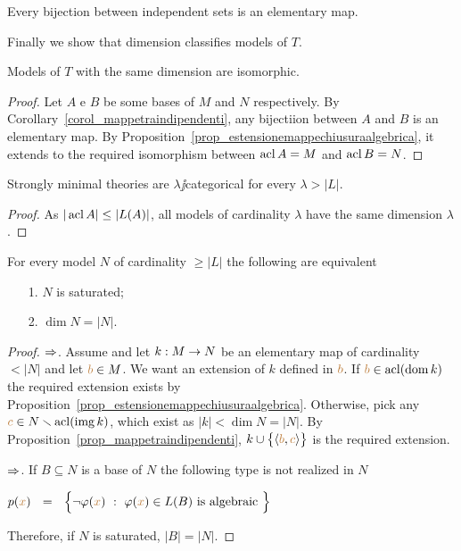 \begin{corollary}\label{corol_mappetraindipendenti} 
Every bijection between independent sets is an elementary map.\QED
\end{corollary}

Finally we show that dimension classifies models of $T$.

\begin{theorem}
Models of $T$ with the same dimension are isomorphic.
\end{theorem}
\begin{proof}
Let $A$ e $B$ be some bases of $M$ and $N$ respectively. By Corollary~\ref{corol_mappetraindipendenti}, any bijectiion between $A$ and $B$ is an elementary map. By Proposition~\ref{prop_estensionemappechiusuraalgebrica}, it extends to the required isomorphism between $\mathop{\rm acl} A=M$ and $\mathop{\rm acl} B=N$.
\end{proof}

\begin{corollary} 
Strongly minimal theories are $\lambda\jj$categorical for every $\lambda>|L|$.
\end{corollary}
\begin{proof}
As $|\mathop{\rm acl} A|\le |L(A)|$, all models of cardinality $\lambda$ have the same dimension $\lambda$.
\end{proof}

\begin{proposition} 
For every model $N$ of cardinality $\ge|L|$ the following are equivalent
\begin{itemize}
\item[1.] $N$ is saturated;
\item[2.] $\dim N=|N|$.
\end{itemize}
\end{proposition}

\begin{proof}
$\Rightarrow$. Assume  and let $k:M\rightarrow N$ be an elementary map of cardinality $<|N|$ and let ${\color{brown} b}\in M$. We want an extension of $k$ defined in ${\color{brown} b}$. If ${\color{brown} b}\in\mathop{\rm acl}(\mathop{\rm dom} k)$ the required extension exists by Proposition~\ref{prop_estensionemappechiusuraalgebrica}. Otherwise, pick any ${\color{brown} c}\in N\smallsetminus\mathop{\rm acl}(\mathop{\rm img} k)$, which exist as $|k|<\dim N=|N|$. By Proposition~\ref{prop_mappetraindipendenti},  $k\cup\big\{\langle{\color{brown}b},{\color{brown} c}\rangle\big\}$ is the required extension.

$\Rightarrow$. If $B\subseteq N$ is a base of $N$ the following type is not realized in $N$

\hfil $p({\color{brown} x})\ \ =\ \ \Big\{\neg\varphi({\color{brown} x})\ :\ \varphi({\color{brown} x})\in L(B)\textrm{ is algebraic }\Big\}$

Therefore, if $N$ is saturated, $|B|=|N|$.
\end{proof}

